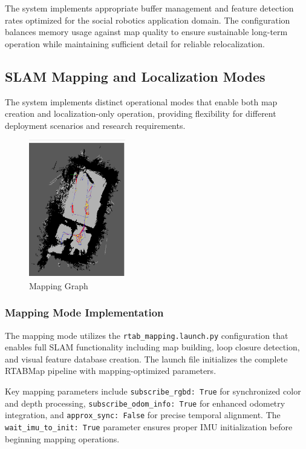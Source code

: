 The system implements appropriate buffer management and feature detection rates optimized for the social robotics application domain. The configuration balances memory usage against map quality to ensure sustainable long-term operation while maintaining sufficient detail for reliable relocalization.

\subsection{SLAM Mapping and Localization Modes}

The system implements distinct operational modes that enable both map creation and localization-only operation, providing flexibility for different deployment scenarios and research requirements.

\begin{figure}[H]
    \centering
    \includegraphics[height=6cm]{Images/mapping graph.png}
    \caption{Mapping Graph}
    \label{fig:mapping_graph}
\end{figure}

\subsubsection{Mapping Mode Implementation}

The mapping mode utilizes the \texttt{rtab\_mapping.launch.py} configuration that enables full SLAM functionality including map building, loop closure detection, and visual feature database creation. The launch file initializes the complete RTABMap pipeline with mapping-optimized parameters.

Key mapping parameters include \texttt{subscribe\_rgbd: True} for synchronized color and depth processing, \texttt{subscribe\_odom\_info: True} for enhanced odometry integration, and \texttt{approx\_sync: False} for precise temporal alignment. The \texttt{wait\_imu\_to\_init: True} parameter ensures proper IMU initialization before beginning mapping operations.

